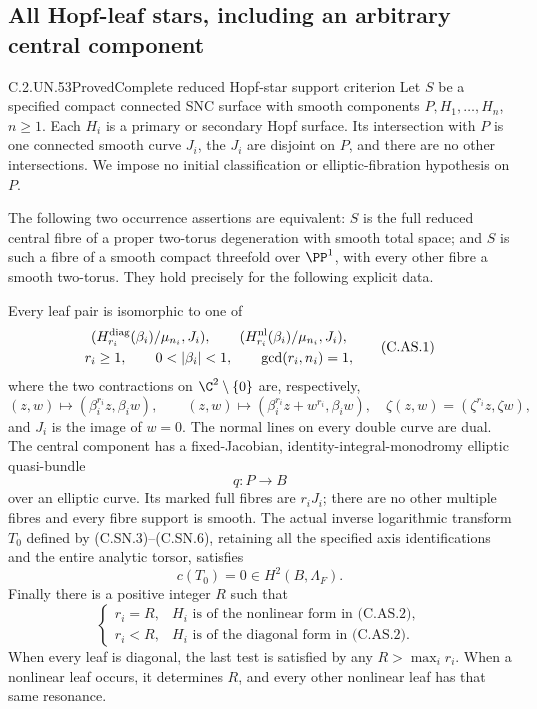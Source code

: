 \subsection{All Hopf-leaf stars, including an arbitrary central component}

\begin{statement}{C.2.UN.53}{Proved}{Complete reduced Hopf-star support criterion}
Let $S$ be a specified compact connected SNC surface with smooth
components $P,H_1,\ldots,H_n$, $n\ge1$. Each $H_i$ is a primary
or secondary Hopf surface. Its intersection with $P$ is one
connected smooth curve $J_i$, the $J_i$ are disjoint on $P$,
and there are no other intersections. We impose no initial
classification or elliptic-fibration hypothesis on $P$.

The following two occurrence assertions are equivalent: $S$
is the full reduced central fibre of a proper two-torus
degeneration with smooth total space; and $S$ is such a fibre
of a smooth compact threefold over $\PP^1$, with every other
fibre a smooth two-torus. They hold precisely for the following
explicit data.

Every leaf pair is isomorphic to one of
\[
 \begin{gathered}
 (H^{\rm diag}_{r_i}(\beta_i)/\mu_{n_i},J_i),\qquad
 (H^{\rm nl}_{r_i}(\beta_i)/\mu_{n_i},J_i),\\
 r_i\ge1,\qquad 0<|\beta_i|<1,\qquad \gcd(r_i,n_i)=1 ,
 \end{gathered}                                             \tag{C.AS.1}
\]
where the two contractions on $\C^2\setminus\{0\}$ are,
respectively,
\[
 (z,w)\longmapsto(\beta_i^{r_i}z,\beta_iw),\qquad
 (z,w)\longmapsto(\beta_i^{r_i}z+w^{r_i},\beta_iw),
 \quad
 \zeta(z,w)=(\zeta^{r_i}z,\zeta w),                         \tag{C.AS.2}
\]
and $J_i$ is the image of $w=0$. The normal lines on every
double curve are dual. The central component has a
fixed-Jacobian, identity-integral-monodromy elliptic
quasi-bundle
\[
                         q:P\longrightarrow B             \tag{C.AS.3}
\]
over an elliptic curve. Its marked full fibres are $r_iJ_i$;
there are no other multiple fibres and every fibre support
is smooth. The actual inverse logarithmic transform $T_0$
defined by (C.SN.3)--(C.SN.6), retaining all the specified
axis identifications and the entire analytic torsor,
satisfies
\[
                         c(T_0)=0\in H^2(B,\Lambda_F).     \tag{C.AS.4}
\]
Finally there is a positive integer $R$ such that
\[
 \begin{cases}
 r_i=R,&H_i\text{ is of the nonlinear form in (C.AS.2)},\\
 r_i<R,&H_i\text{ is of the diagonal form in (C.AS.2)}.
 \end{cases}                                             \tag{C.AS.5}
\]
When every leaf is diagonal, the last test is satisfied by
any $R>\max_i r_i$. When a nonlinear leaf occurs, it
determines $R$, and every other nonlinear leaf has that
same resonance.


\end{statement}

